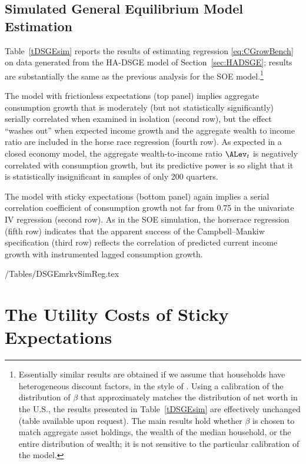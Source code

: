 \documentclass[titlepage]{\econtex}\newcommand{\texname}{cAndCwithStickyE}
\begin{document}
\subsection{Simulated General Equilibrium Model Estimation}

Table~\ref{tDSGEsim} reports the results of estimating regression \eqref{eq:CGrowBench} on data generated from the HA-DSGE model of Section~\ref{sec:HADSGE}; results are substantially the same as the previous analysis for the SOE model.\footnote{Essentially similar results are obtained if we assume that households have heterogeneous discount factors, in the style of \cite{cstwMPC}.  Using a calibration of the distribution of $\beta$ that approximately matches the distribution of net worth in the U.S., the results presented in Table~\ref{tDSGEsim} are effectively unchanged (table available upon request).  The main results hold whether $\beta$ is chosen to match aggregate asset holdings, the wealth of the median household, or the entire distribution of wealth; it is not sensitive to the particular calibration of the model.}

The model with frictionless expectations (top panel) implies aggregate consumption growth that is moderately (but not statistically significantly) serially correlated when examined in isolation (second row), but the effect ``washes out'' when expected income growth and the aggregate wealth to income ratio are included in the horse race regression (fourth row).  As expected in a closed economy model, the aggregate wealth-to-income ratio $\ALev_t$ is negatively correlated with consumption growth, but its predictive power is so slight that it is statistically insignificant in samples of only 200 quarters.

The model with sticky expectations (bottom panel) again implies a serial correlation coefficient of consumption growth not far from 0.75 in the univariate IV regression (second row).  As in the SOE simulation, the horserace regression (fifth row) indicates that the apparent success of the Campbell--Mankiw specification (third row) reflects the correlation of predicted current income growth with instrumented lagged consumption growth.

\econtexRoot/Tables/DSGEmrkvSimReg.tex



\section{The Utility Costs of Sticky Expectations}\label{sec:uCost}
\end{document}
